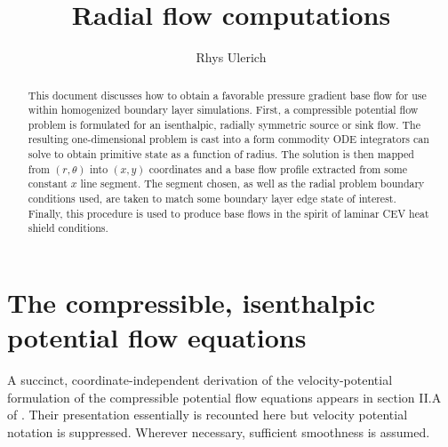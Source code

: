 \documentclass[letterpaper,11pt,nointlimits,reqno]{amsart}
\begin{document}
\title{Radial flow computations}
\author{Rhys Ulerich}

\begin{abstract}
This document discusses how to obtain a favorable pressure gradient base flow
for use within homogenized boundary layer simulations.  First, a
compressible potential flow problem is formulated for an isenthalpic, radially
symmetric source or sink flow.  The resulting one-dimensional problem is cast
into a form commodity ODE integrators can solve to obtain primitive state as a
function of radius.  The solution is then mapped from $\left(r,\theta\right)$
into $\left(x,y\right)$ coordinates and a base flow profile extracted from some
constant $x$ line segment.  The segment chosen, as well as the radial problem
boundary conditions used, are taken to match some boundary layer edge state of
interest.  Finally, this procedure is used to produce base flows in the spirit
of laminar CEV heat shield conditions.
\end{abstract}

\maketitle

\tableofcontents

\section{The compressible, isenthalpic potential flow equations}

A succinct, coordinate-independent derivation of the velocity-potential
formulation of the compressible potential flow equations appears in section
II.A of \citet{Saad2011Coordinate}.  Their presentation essentially is
recounted here but velocity potential notation is suppressed.  Wherever
necessary, sufficient smoothness is assumed.
\end{document}
